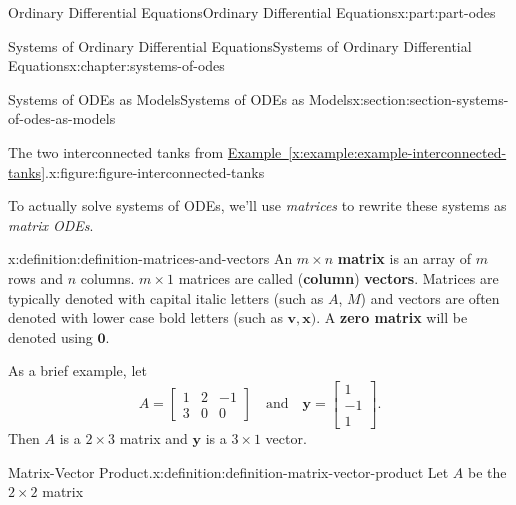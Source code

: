 \documentclass[oneside,10pt,]{book}
\newcommand{\xreffont}{\relax}
\newcommand{\terminology}[1]{\textbf{#1}}
\numberwithin{equation}{part}
\renewcommand{\vec}[1]{\mathbf{#1}}
\newcommand{\amp}{&}
\begin{document}
\begin{partptx}{Ordinary Differential Equations}{}{Ordinary Differential Equations}{}{}{x:part:part-odes}
\begin{chapterptx}{Systems of Ordinary Differential Equations}{}{Systems of Ordinary Differential Equations}{}{}{x:chapter:systems-of-odes}
\begin{sectionptx}{Systems of ODEs as Models}{}{Systems of ODEs as Models}{}{}{x:section:section-systems-of-odes-as-models}
\begin{figureptx}{The two interconnected tanks from \hyperref[x:example:example-interconnected-tanks]{Example~{\xreffont\ref{x:example:example-interconnected-tanks}}}.}{x:figure:figure-interconnected-tanks}{}
\begin{image}{0}{1}{0}
{
}%
\end{image}%
\tcblower
\end{figureptx}%
To actually solve systems of ODEs, we'll use \emph{matrices} to rewrite these systems as \emph{matrix ODEs}.%
\begin{definition}{}{x:definition:definition-matrices-and-vectors}%
%
%
An \(m\times n\) \terminology{matrix} is an array of \(m\) rows and \(n\) columns. \(m\times1\) matrices are called (\terminology{column}) \terminology{vectors}. Matrices are typically denoted with capital italic letters (such as \(A\), \(M\)) and vectors are often denoted with lower case bold letters (such as \(\vec{v},\vec{x})\). A \terminology{zero matrix} will be denoted using \(\vec{0}\).%
\end{definition}
As a brief example, let%
\begin{equation*}
A = \begin{bmatrix} 1\amp2\amp-1\\3\amp0\amp0\end{bmatrix}\quad\text{and}\quad \vec{y} = \begin{bmatrix} 1\\-1\\1 \end{bmatrix}.
\end{equation*}
Then \(A\) is a \(2\times3\) matrix and \(\vec{y}\) is a \(3\times 1\) vector.%
\begin{definition}{Matrix-Vector Product.}{x:definition:definition-matrix-vector-product}%
Let \(A\) be the \(2\times 2\) matrix%
\begin{equation*}

\end{equation*}
\end{definition}
\end{sectionptx}
\end{chapterptx}
\end{partptx}
\end{document}
